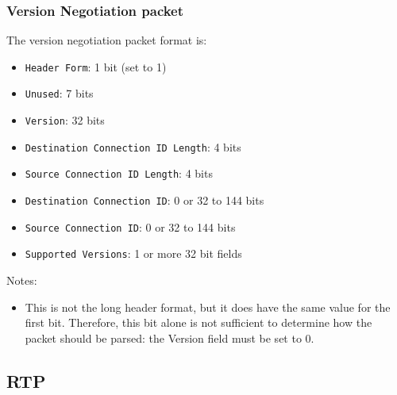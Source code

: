 \documentclass[10pt,a4paper]{article}
\begin{document}
\subsubsection*{Version Negotiation packet}

The version negotiation packet format is:
\begin{itemize}
\item \texttt{Header Form}: 1 bit (set to 1)
\item \texttt{Unused}: 7 bits
\item \texttt{Version}: 32 bits
\item \texttt{Destination Connection ID Length}: 4 bits
\item \texttt{Source Connection ID Length}: 4 bits
\item \texttt{Destination Connection ID}: 0 or 32 to 144 bits
\item \texttt{Source Connection ID}: 0 or 32 to 144 bits
\item \texttt{Supported Versions}: 1 or more 32 bit fields
\end{itemize}

Notes:
\begin{itemize}
\item This is not the long header format, but it does have the same value for the first
bit. Therefore, this bit alone is not sufficient to determine how the packet should be
parsed: the Version field must be set to 0.
\end{itemize}

\subsection{RTP}
\end{document}
